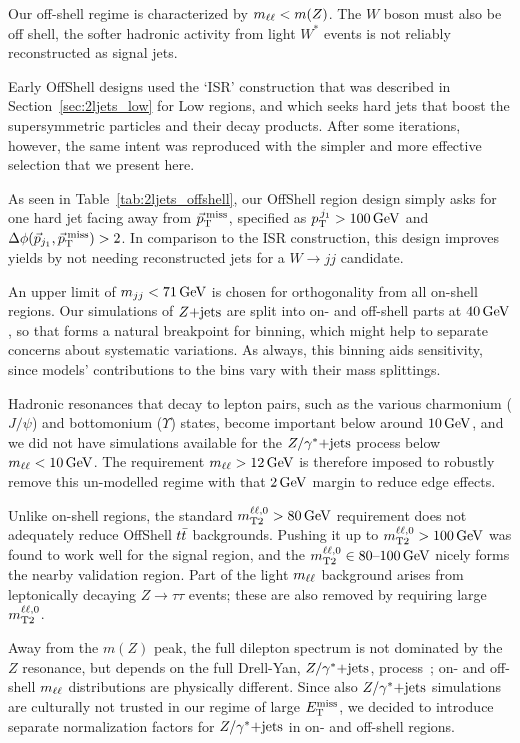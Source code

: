 Our off-shell regime is characterized by $\mll < m(Z)$.
The $W$ boson must also be off shell, the softer hadronic activity from
light $W^*$ events is not reliably reconstructed as signal jets.

Early OffShell designs used the `ISR' construction that was described in
Section~\ref{sec:2ljets_low} for Low regions,
and which seeks hard jets that boost the supersymmetric particles and their
decay products.
After some iterations, however, the same intent was reproduced with the simpler
and more effective selection that we present here.

As seen in Table~\ref{tab:2ljets_offshell}, our OffShell region design
simply asks for one hard jet facing away from $\ptmiss$, specified as
$\ptjone > 100\,\eV[G]$ and $\dphijmet > 2$.
In comparison to the ISR construction, this design improves yields by not
needing reconstructed jets for a $W\to jj$ candidate.

An upper limit of $\mjj < 71\,\eV[G]$ is chosen for orthogonality from all
on-shell regions.
Our simulations of $\zjets$ are split into on- and off-shell parts at
$40\,\eV[G]$, so that forms a natural breakpoint for binning, which might help
to separate concerns about systematic variations.
As always, this binning aids sensitivity, since models' contributions to the
bins vary with their mass splittings.

Hadronic resonances that decay to lepton pairs,
such as the various charmonium ($J/\psi$) and bottomonium ($\Upsilon$) states,
become important below around $10\,\eV[G]$, and we did not have simulations
available for the $\zyjets$ process below $\mll < 10\,\eV[G]$.
The requirement $\mll > 12\,\eV[G]$ is therefore imposed to robustly remove
this un-modelled regime with that $2\,\eV[G]$ margin to reduce edge effects.

Unlike on-shell regions, the standard $\mttwoll > 80\,\eV[G]$ requirement does
not adequately reduce OffShell $\ttbar$ backgrounds.
Pushing it up to $\mttwoll > 100\,\eV[G]$ was found to work well for the signal
region, and the $\mttwoll \in 80\textrm{--}100\,\eV[G]$ nicely forms the
nearby validation region.
Part of the light $\mll$ background arises from leptonically decaying
$Z\to \tau\tau$ events; these are also removed by requiring large
$\mttwoll$.

Away from the $m(Z)$ peak, the full dilepton spectrum is not dominated by the
$Z$ resonance, but depends on the full Drell-Yan, $\zyjets$,
process~\cite{drell1970massive};
on- and off-shell $\mll$ distributions are physically different.
Since also $\zyjets$ simulations are culturally not trusted in our regime of
large $\met$, we decided to introduce separate normalization factors for
$\zyjets$ in on- and off-shell regions.

